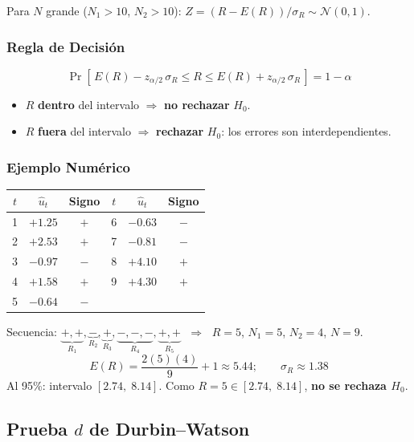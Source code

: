 \documentclass[11pt, letterpaper]{article}
\begin{document}
Para $N$ grande ($N_1>10$, $N_2>10$):
$Z = (R - E(R))/\sigma_R \sim \mathcal{N}(0,1)$.

\subsubsection{Regla de Decisi\'on}

\[
  \Pr\!\left[\,E(R) - z_{\alpha/2}\,\sigma_R
             \leq R \leq
             E(R) + z_{\alpha/2}\,\sigma_R\,\right] = 1 - \alpha
\]

\begin{itemize}
  \item $R$ \textbf{dentro} del intervalo $\Rightarrow$
    \textbf{no rechazar} $H_0$.
  \item $R$ \textbf{fuera} del intervalo $\Rightarrow$
    \textbf{rechazar} $H_0$: los errores son interdependientes.
\end{itemize}

\subsubsection{Ejemplo Num\'erico}

\begin{center}
\begin{tabular}{ccc|ccc}
\toprule
$t$ & $\hat{u}_t$ & Signo &
$t$ & $\hat{u}_t$ & Signo \\
\midrule
1 & $+1.25$ & $+$ & 6 & $-0.63$ & $-$ \\
2 & $+2.53$ & $+$ & 7 & $-0.81$ & $-$ \\
3 & $-0.97$ & $-$ & 8 & $+4.10$ & $+$ \\
4 & $+1.58$ & $+$ & 9 & $+4.30$ & $+$ \\
5 & $-0.64$ & $-$ & & & \\
\bottomrule
\end{tabular}
\end{center}

\noindent Secuencia: $\underbrace{+,+}_{R_1},\underbrace{-}_{R_2},
\underbrace{+}_{R_3},\underbrace{-,-,-}_{R_4},\underbrace{+,+}_{R_5}$
$\;\Rightarrow\;$ $R=5$, $N_1=5$, $N_2=4$, $N=9$.
\[
  E(R) = \frac{2(5)(4)}{9}+1 \approx 5.44; \qquad
  \sigma_R \approx 1.38
\]
Al 95\%: intervalo $[2.74,\;8.14]$. Como $R=5 \in [2.74,\;8.14]$,
\textbf{no se rechaza $H_0$}.

\subsection{Prueba $d$ de Durbin--Watson}
\end{document}
